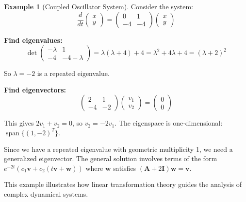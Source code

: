 \documentclass[12pt]{article}
\numberwithin{equation}{section}
\newcommand{\vect}[1]{\boldsymbol{#1}}   %
\newcommand{\mat}[1]{\mathbf{#1}}        %
\newcommand{\Span}{\operatorname{span}}
\theoremstyle{plain}
\theoremstyle{definition}
\newtheorem{example}[theorem]{Example}
\theoremstyle{remark}
\begin{document}
\begin{example}[Coupled Oscillator System]
Consider the system:
$$\frac{d}{dt}\begin{pmatrix} x \\ y \end{pmatrix} = \begin{pmatrix} 0 & 1 \\ -4 & -4 \end{pmatrix}\begin{pmatrix} x \\ y \end{pmatrix}$$

\textbf{Find eigenvalues:}
$$\det\begin{pmatrix} -\lambda & 1 \\ -4 & -4-\lambda \end{pmatrix} = \lambda(\lambda + 4) + 4 = \lambda^2 + 4\lambda + 4 = (\lambda + 2)^2$$

So $\lambda = -2$ is a repeated eigenvalue.

\textbf{Find eigenvectors:}
$$\begin{pmatrix} 2 & 1 \\ -4 & -2 \end{pmatrix}\begin{pmatrix} v_1 \\ v_2 \end{pmatrix} = \begin{pmatrix} 0 \\ 0 \end{pmatrix}$$

This gives $2v_1 + v_2 = 0$, so $v_2 = -2v_1$. The eigenspace is one-dimensional: $\Span\{(1, -2)^T\}$.

Since we have a repeated eigenvalue with geometric multiplicity 1, we need a generalized eigenvector. The general solution involves terms of the form $e^{-2t}(c_1\vect{v} + c_2(t\vect{v} + \vect{w}))$ where $\vect{w}$ satisfies $(\mat{A} + 2\mat{I})\vect{w} = \vect{v}$.

This example illustrates how linear transformation theory guides the analysis of complex dynamical systems.
\end{example}
\end{document}
